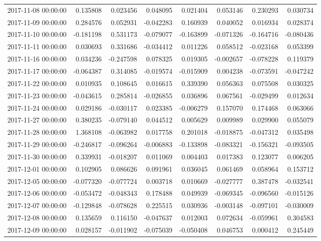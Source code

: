 \begin{tabular}{lrrrrrrr}
2017-11-08 00:00:00 & 0.135808 & 0.023456 & 0.048095 & 0.021404 & 0.053146 & 0.230293 & 0.030734 \\
2017-11-09 00:00:00 & 0.284576 & 0.052931 & -0.042283 & 0.160939 & 0.040052 & 0.016934 & 0.028374 \\
2017-11-10 00:00:00 & -0.181198 & 0.531173 & -0.079077 & -0.163899 & -0.071326 & -0.164716 & -0.080436 \\
2017-11-11 00:00:00 & 0.030693 & 0.331686 & -0.034412 & 0.011226 & 0.058512 & -0.023168 & 0.053399 \\
2017-11-16 00:00:00 & 0.034236 & -0.247598 & 0.078325 & 0.019305 & -0.002657 & -0.078228 & 0.119379 \\
2017-11-17 00:00:00 & -0.064387 & 0.314085 & -0.019574 & -0.015909 & 0.004238 & -0.073591 & -0.047242 \\
2017-11-22 00:00:00 & 0.010935 & 0.108645 & 0.016615 & 0.339390 & 0.056363 & 0.075508 & 0.030325 \\
2017-11-23 00:00:00 & -0.043615 & 0.285814 & -0.026855 & 0.036896 & 0.067561 & -0.029499 & 0.012634 \\
2017-11-24 00:00:00 & 0.029186 & -0.030117 & 0.023385 & -0.006279 & 0.157070 & 0.174468 & 0.063066 \\
2017-11-27 00:00:00 & 0.380235 & -0.079140 & 0.044512 & 0.005629 & 0.009989 & 0.029900 & 0.055079 \\
2017-11-28 00:00:00 & 1.368108 & -0.063982 & 0.017758 & 0.201018 & -0.018875 & -0.047312 & 0.035498 \\
2017-11-29 00:00:00 & -0.246817 & -0.096264 & -0.006883 & -0.133898 & -0.083321 & -0.156321 & -0.093505 \\
2017-11-30 00:00:00 & 0.339931 & -0.018207 & 0.011069 & 0.004403 & 0.017383 & 0.123077 & 0.006205 \\
2017-12-01 00:00:00 & 0.102905 & 0.086626 & 0.091961 & 0.036045 & 0.061469 & 0.058964 & 0.153712 \\
2017-12-05 00:00:00 & -0.077320 & -0.077724 & 0.003718 & 0.010669 & -0.027777 & 0.387478 & -0.032541 \\
2017-12-06 00:00:00 & -0.053472 & -0.048343 & 0.178488 & 0.049939 & -0.069345 & -0.096560 & -0.015126 \\
2017-12-07 00:00:00 & -0.129848 & -0.078628 & 0.225515 & 0.030936 & -0.003148 & -0.097101 & -0.030009 \\
2017-12-08 00:00:00 & 0.135659 & 0.116150 & -0.047637 & 0.012003 & 0.072634 & -0.059961 & 0.304583 \\
2017-12-09 00:00:00 & 0.028157 & -0.011902 & -0.075039 & -0.050408 & 0.046753 & 0.000412 & 0.245449 \\

\end{tabular}
